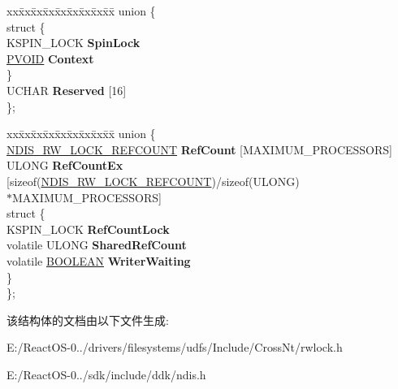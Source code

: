 \begin{DoxyCompactItemize}
\begin{tabbing}
\end{tabbing}\item 
\mbox{\label{struct___n_d_i_s___r_w___l_o_c_k_a07a396eb64c9a9ea674ea9ba15aaf986}} 
\begin{tabbing}
xx\=xx\=xx\=xx\=xx\=xx\=xx\=xx\=xx\=\kill
union \{\\
\mbox{\label{union___n_d_i_s___r_w___l_o_c_k_1_1_0D1716_a8cbc7494e2efe1ed718c9007122733df}} 
\>struct \{\\
\>\>KSPIN\_LOCK {\bfseries SpinLock}\\
\>\>\hyperlink{interfacevoid}{PVOID} {\bfseries Context}\\
\>\} \\
\>UCHAR {\bfseries Reserved} \mbox{[}16\mbox{]}\\
\}; \\

\end{tabbing}\item 
\mbox{\label{struct___n_d_i_s___r_w___l_o_c_k_ad233356215cc8bcc9cfd74847a48c094}} 
\begin{tabbing}
xx\=xx\=xx\=xx\=xx\=xx\=xx\=xx\=xx\=\kill
union \{\\
\>\hyperlink{union___n_d_i_s___r_w___l_o_c_k___r_e_f_c_o_u_n_t}{NDIS\_RW\_LOCK\_REFCOUNT} {\bfseries RefCount} \mbox{[}MAXIMUM\_PROCESSORS\mbox{]}\\
\>ULONG {\bfseries RefCountEx} \mbox{[}sizeof(\hyperlink{union___n_d_i_s___r_w___l_o_c_k___r_e_f_c_o_u_n_t}{NDIS\_RW\_LOCK\_REFCOUNT})/sizeof(ULONG) \\
\>\>$\ast$MAXIMUM\_PROCESSORS\mbox{]}\\
\mbox{\label{union___n_d_i_s___r_w___l_o_c_k_1_1_0D1718_ab672ef21b93dbe6679d0d80eec7c63d1}} 
\>struct \{\\
\>\>KSPIN\_LOCK {\bfseries RefCountLock}\\
\>\>volatile ULONG {\bfseries SharedRefCount}\\
\>\>volatile \hyperlink{_processor_bind_8h_a112e3146cb38b6ee95e64d85842e380a}{BOOLEAN} {\bfseries WriterWaiting}\\
\>\} \\
\}; \\

\end{tabbing}\end{DoxyCompactItemize}


该结构体的文档由以下文件生成\+:\begin{DoxyCompactItemize}
\item 
E\+:/\+React\+O\+S-\/0../drivers/filesystems/udfs/\+Include/\+Cross\+Nt/rwlock.\+h\item 
E\+:/\+React\+O\+S-\/0../sdk/include/ddk/ndis.\+h\end{DoxyCompactItemize}
